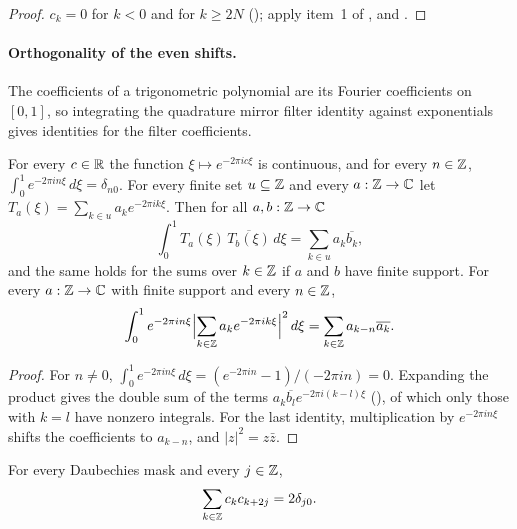 \begin{proof}
\leanok
{}
$c_k = 0$ for $k < 0$ and for $k \geq 2N$ (); apply item~1 of
, and .
\end{proof}

\paragraph{Orthogonality of the even shifts.}
The coefficients of a trigonometric polynomial are its Fourier coefficients on $[0, 1]$, so
integrating the quadrature mirror filter identity against exponentials gives identities for the
filter coefficients.

\begin{lemma}
\label{lem:daub-exp-orthonormal}
\leanok
For every $c \in \mathbb{R}$ the function $\xi \mapsto e^{-2\pi i c \xi}$ is continuous, and for every
$n \in \mathbb{Z}$, $\int_0^1 e^{-2\pi i n \xi} \, d\xi = \delta_{n0}$. For every finite set
$u \subseteq \mathbb{Z}$ and every $a : \mathbb{Z} \to \mathbb{C}$ let
$T_a(\xi) = \sum_{k \in u} a_k e^{-2\pi i k \xi}$. Then for all $a, b : \mathbb{Z} \to \mathbb{C}$
\[
  \int_0^1 T_a(\xi) \, \overline{T_b(\xi)} \, d\xi = \sum_{k \in u} a_k \overline{b_k} ,
\]
and the same holds for the sums over $k \in \mathbb{Z}$ if $a$ and $b$ have finite support. For every
$a : \mathbb{Z} \to \mathbb{C}$ with finite support and every $n \in \mathbb{Z}$,
\[
  \int_0^1 e^{-2\pi i n \xi} \Bigl|\sum_{k \in \mathbb{Z}} a_k e^{-2\pi i k \xi}\Bigr|^2 \, d\xi
  = \sum_{k \in \mathbb{Z}} a_{k-n} \overline{a_k} .
\]
\end{lemma}

\begin{proof}
\leanok
{}
For $n \neq 0$, $\int_0^1 e^{-2\pi i n \xi} \, d\xi = (e^{-2\pi i n} - 1)/(-2\pi i n) = 0$.
Expanding the product gives the double sum of the terms
$a_k \overline{b_l} e^{-2\pi i (k - l) \xi}$ (), of which only those with
$k = l$ have nonzero integrals. For the last identity, multiplication by $e^{-2\pi i n \xi}$
shifts the coefficients to $a_{k-n}$, and $|z|^2 = z \bar z$.
\end{proof}

\begin{proposition}
\label{prop:daub-even-shifts}
\leanok
{}
For every Daubechies mask and every $j \in \mathbb{Z}$,
\[
  \sum_{k \in \mathbb{Z}} c_k c_{k+2j} = 2 \delta_{j0} .
\]
\end{proposition}

